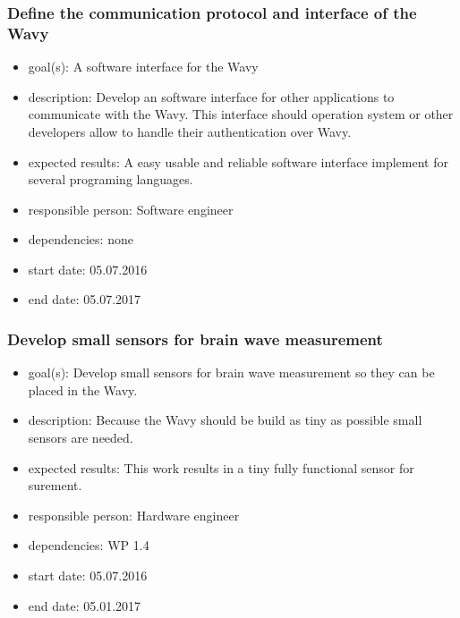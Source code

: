 \subsubsection{Define the communication protocol and interface of the Wavy}
\begin{itemize}
 \item goal(s): A software interface for the Wavy
 \item description: Develop an software interface for other applications to communicate with the Wavy. This interface should operation system or other developers allow to handle their authentication over Wavy.
 \item expected results: A easy usable and reliable software interface implement for several programing languages.
 \item responsible person: Software engineer
 \item dependencies: none
 \item start date: 05.07.2016
 \item end date: 05.07.2017
\end{itemize}

\subsubsection{Develop small sensors for brain wave measurement}
\begin{itemize}
 \item goal(s): Develop small sensors for brain wave measurement so they can be placed in the Wavy.
 \item description: Because the Wavy should be build as tiny as possible small sensors are needed.
 \item expected results: This work results in a tiny fully functional sensor for surement.
 \item responsible person: Hardware engineer
 \item dependencies: WP 1.4
 \item start date: 05.07.2016
 \item end date: 05.01.2017
\end{itemize}


